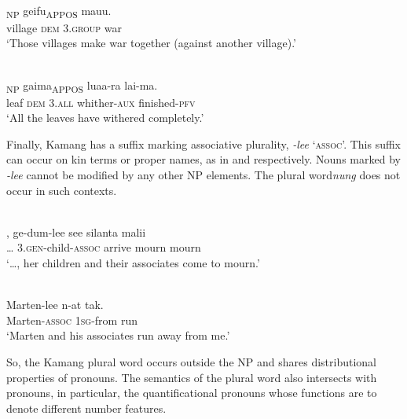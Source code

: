 \ea%
\label{ex:9:42}
 \\
\textsubscript{NP} {geifu}\textsubscript{APPOS}   {mauu.}\\
  village \textsc{dem} 3.\textsc{group} war  \\
\glt `Those villages make war together (against another village).'
\z






\ea%
\label{ex:9:43}
 \\
\textsubscript{NP} {gaima}\textsubscript{APPOS} luaa-ra lai-ma{.}\\
    leaf \textsc{dem}   3.\textsc{all} whither-\textsc{aux} finished-\textsc{pfv}\\
\glt `All the leaves have withered completely.'
\z






Finally, Kamang has a suffix marking associative plurality, \textit{-lee} `\textsc{assoc}'. This suffix can occur on kin terms or proper names, as in  and  respectively. Nouns marked by \textit{-lee} cannot be modified by any other NP elements. The plural word\textit{nung} does not occur in such contexts.


\ea%
\label{ex:9:44}
 \\
\gll  {\dots},   ge-dum-lee see silanta malii \\
  {\dots} 3.\textsc{gen}-child-\textsc{assoc} arrive mourn mourn \\
\glt `{\dots}, her children and their associates come to mourn.'
\z







\ea%
\label{ex:9:45}
 \\
\gll  Marten-lee n-at tak.  \\
  Marten-\textsc{assoc} 1\textsc{sg}-from run   \\
\glt `Marten and his associates run away from me.'
\z






So, the Kamang plural word occurs outside the NP and shares distributional properties of pronouns. The semantics of the plural word also intersects with pronouns, in particular, the quantificational pronouns whose functions are to denote different number features.


